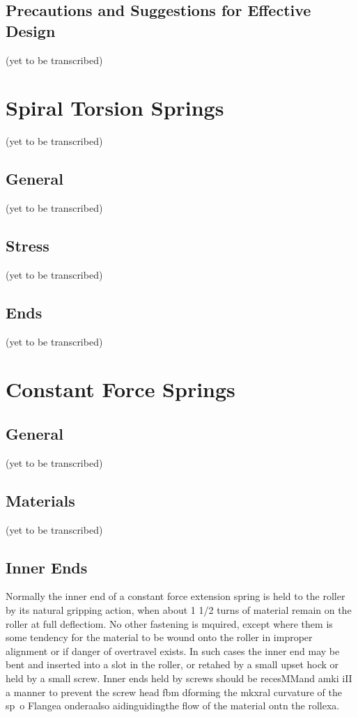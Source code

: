 \documentclass[10pt]{article}
\begin{document}
\subsection{Precautions and Suggestions for Effective Design} %
(yet to be transcribed)

\clearpage
\section{Spiral Torsion Springs} %
(yet to be transcribed)

\subsection{General} %
(yet to be transcribed)

\subsection{Stress} %
(yet to be transcribed)


\subsection{Ends} %
(yet to be transcribed)

\clearpage
\section{Constant Force Springs} %
\subsection{General}%
(yet to be transcribed)


\subsection{Materials} %
(yet to be transcribed)

\subsection{Inner Ends} %
Normally the inner end of a constant force extension spring is held to the roller by its natural gripping action, when about 1 1/2 turns of material remain on the roller at full deflectiom. 
No other fastening is mquired, except where them is some
tendency for the material to be wound onto the roller in improper alignment or if danger
of overtravel exists. 
In such cases the inner end may be bent and inserted into a slot in the roller, or retahed by a small upset hock
or held by a small screw. Inner ends held by
screws should be recesMMand amki iII a
manner to prevent the screw head fbm dforming
the mkxral curvature of the sp~o
Flangea onderaalso aidinguidingthe
flow of the material ontn the rollexa.
\end{document}
